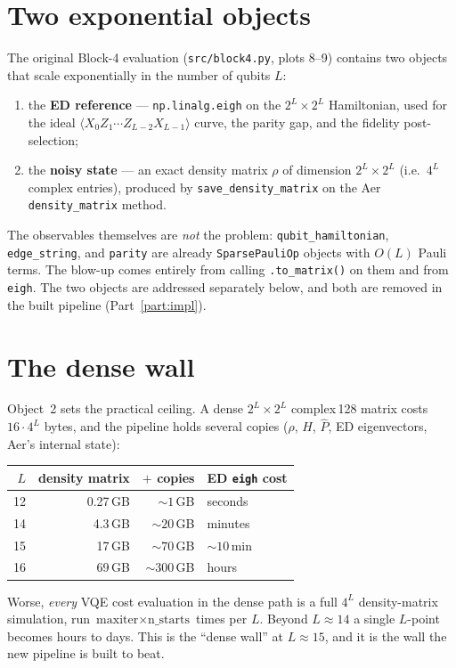 \documentclass[11pt]{article}
\newcommand{\Pop}{\hat{P}}
\newcommand{\Oedge}{X_0 Z_1\cdots Z_{L-2} X_{L-1}}
\newcommand{\expv}[1]{\langle #1\rangle}
\newcommand{\code}[1]{\texttt{#1}}
\begin{document}
\section{Two exponential objects}
The original Block-4 evaluation (\code{src/block4.py}, plots 8--9) contains two
objects that scale exponentially in the number of qubits $L$:
\begin{enumerate}
\item the \textbf{ED reference} --- \code{np.linalg.eigh} on the
      $2^L\times 2^L$ Hamiltonian, used for the ideal $\expv{\Oedge}$ curve, the
      parity gap, and the fidelity post-selection;
\item the \textbf{noisy state} --- an exact density matrix $\rho$ of dimension
      $2^L\times 2^L$ (i.e.\ $4^L$ complex entries), produced by
      \code{save\_density\_matrix} on the Aer \code{density\_matrix} method.
\end{enumerate}
The observables themselves are \emph{not} the problem: \code{qubit\_hamiltonian},
\code{edge\_string}, and \code{parity} are already \code{SparsePauliOp} objects
with $O(L)$ Pauli terms. The blow-up comes entirely from calling
\code{.to\_matrix()} on them and from \code{eigh}. The two objects are addressed
separately below, and both are removed in the built pipeline
(Part~\ref{part:impl}).

\section{The dense wall}
Object~2 sets the practical ceiling. A dense $2^L\times 2^L$ complex\,128 matrix
costs $16\cdot 4^L$ bytes, and the pipeline holds several copies ($\rho$, $H$,
$\Pop$, ED eigenvectors, Aer's internal state):
\begin{center}
\begin{tabular}{rrrl}
\toprule
$L$ & density matrix & $+$ copies & ED \code{eigh} cost \\
\midrule
12 & 0.27\,GB & ${\sim}1$\,GB & seconds \\
14 & 4.3\,GB & ${\sim}20$\,GB & minutes \\
15 & 17\,GB & ${\sim}70$\,GB & ${\sim}10$\,min \\
16 & 69\,GB & ${\sim}300$\,GB & hours \\
\bottomrule
\end{tabular}
\end{center}
Worse, \emph{every} VQE cost evaluation in the dense path is a full $4^L$
density-matrix simulation, run $\text{maxiter}\times\text{n\_starts}$ times per
$L$. Beyond $L\approx 14$ a single $L$-point becomes hours to days. This is the
``dense wall'' at $L\approx 15$, and it is the wall the new pipeline is built to
beat.
\end{document}
